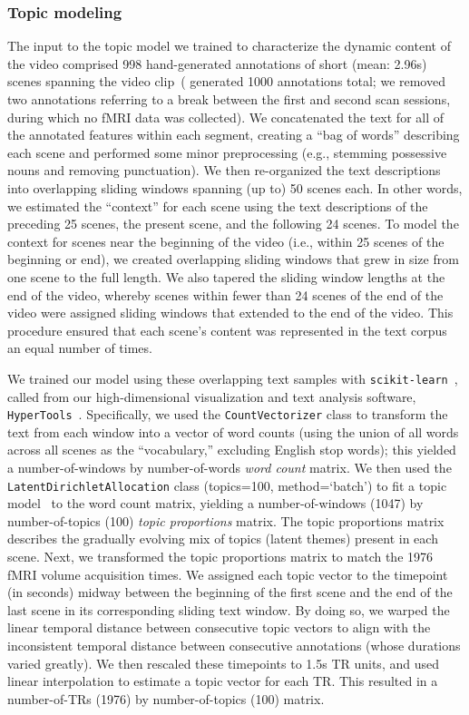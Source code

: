 \documentclass{article}
\begin{document}
\subsubsection*{Topic modeling}
The input to the topic model we trained to characterize the dynamic content of the video comprised 998 hand-generated annotations of short (mean: 2.96s) scenes spanning the video clip~(\citealp{ChenEtal17} generated 1000 annotations total; we removed two annotations referring to a break between the first and second scan sessions, during which no fMRI data was collected).  We concatenated the text for all of the annotated features within each segment, creating a ``bag of words'' describing each scene and performed some minor preprocessing (e.g., stemming possessive nouns and removing punctuation).  We then re-organized the text descriptions into overlapping sliding windows spanning (up to) 50 scenes each.  In other words, we estimated the ``context'' for each scene using the text descriptions of the preceding 25 scenes, the present scene, and the following 24 scenes.  To model the context for scenes near the beginning of the video (i.e., within 25 scenes of the beginning or end), we created overlapping sliding windows that grew in size from one scene to the full length.  We also tapered the sliding window lengths at the end of the video, whereby scenes within fewer than 24 scenes of the end of the video were assigned sliding windows that extended to the end of the video.  This procedure ensured that each scene's content was represented in the text corpus an equal number of times.

We trained our model using these overlapping text samples with \texttt{scikit-learn}~\citep[version 0.19.1; ][]{PedrEtal11}, called from our high-dimensional visualization and text analysis software, \texttt{HyperTools}~\citep{HeusEtal18a}.  Specifically, we used the \texttt{CountVectorizer} class to transform the text from each window into a vector of word counts (using the union of all words across all scenes as the ``vocabulary,'' excluding English stop words); this yielded a number-of-windows by number-of-words \textit{word count} matrix.  We then used the \texttt{LatentDirichletAllocation} class (topics=100, method=`batch') to fit a topic model~\citep{BleiEtal03} to the word count matrix, yielding a number-of-windows (1047) by number-of-topics (100) \textit{topic proportions} matrix.  The topic proportions matrix describes the gradually evolving mix of topics (latent themes) present in each scene.  Next, we transformed the topic proportions matrix to match the 1976 fMRI volume acquisition times.  We assigned each topic vector to the timepoint (in seconds) midway between the beginning of the first scene and the end of the last scene in its corresponding sliding text window.  By doing so, we warped the linear temporal distance between consecutive topic vectors to align with the inconsistent temporal distance between consecutive annotations (whose durations varied greatly).  We then rescaled these timepoints to 1.5s TR units, and used linear interpolation to estimate a topic vector for each TR.  This resulted in a number-of-TRs (1976) by number-of-topics (100) matrix.
\end{document}
